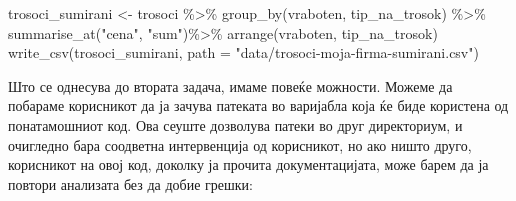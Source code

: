 \documentclass[
]{book}
\newenvironment{Shaded}{\begin{snugshade}}{\end{snugshade}}
\newcommand{\AttributeTok}[1]{\textcolor[rgb]{0.77,0.63,0.00}{#1}}
\newcommand{\FunctionTok}[1]{\textcolor[rgb]{0.00,0.00,0.00}{#1}}
\newcommand{\NormalTok}[1]{#1}
\newcommand{\OtherTok}[1]{\textcolor[rgb]{0.56,0.35,0.01}{#1}}
\newcommand{\SpecialCharTok}[1]{\textcolor[rgb]{0.00,0.00,0.00}{#1}}
\newcommand{\StringTok}[1]{\textcolor[rgb]{0.31,0.60,0.02}{#1}}
\begin{document}
\begin{Shaded}
\begin{Highlighting}[]
\NormalTok{trosoci\_sumirani }\OtherTok{\textless{}{-}}\NormalTok{ trosoci }\SpecialCharTok{\%\textgreater{}\%} 
  \FunctionTok{group\_by}\NormalTok{(vraboten, tip\_na\_trosok) }\SpecialCharTok{\%\textgreater{}\%} 
  \FunctionTok{summarise\_at}\NormalTok{(}\StringTok{"cena"}\NormalTok{, }\StringTok{"sum"}\NormalTok{)}\SpecialCharTok{\%\textgreater{}\%} 
  \FunctionTok{arrange}\NormalTok{(vraboten, tip\_na\_trosok)}
\FunctionTok{write\_csv}\NormalTok{(trosoci\_sumirani, }
          \AttributeTok{path =} \StringTok{"data/trosoci{-}moja{-}firma{-}sumirani.csv"}\NormalTok{)}
\end{Highlighting}
\end{Shaded}

Што се однесува до втората задача, имаме повеќе можности. Можеме да побараме корисникот да ја зачува патеката во варијабла која ќе биде користена од понатамошниот код. Ова сеуште дозволува патеки во друг директориум, и очигледно бара соодветна интервенција од корисникот, но ако ништо друго, корисникот на овој код, доколку ја прочита документацијата, може барем да ја повтори анализата без да добие грешки:
\end{document}
